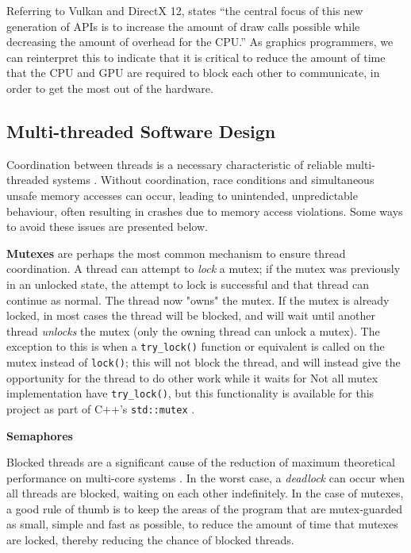 \documentclass[11pt, a4paper, twocolumn]{article}
\begin{document}
Referring to Vulkan and DirectX 12, \citet{Joseph2016} states ``the central focus of this new generation of APIs is to increase the amount of draw calls possible while decreasing the amount of overhead for the CPU.'' As graphics programmers, we can reinterpret this to indicate that it is critical to reduce the amount of time that the CPU and GPU are required to block each other to communicate, in order to get the most out of the hardware.

\subsection{Multi-threaded Software Design}

Coordination between threads is a necessary characteristic of reliable multi-threaded systems \citep{Powell}. Without coordination, race conditions and simultaneous unsafe memory accesses can occur, leading to unintended, unpredictable behaviour, often resulting in crashes due to memory access violations. Some ways to avoid these issues are presented below.

\textbf{Mutexes} are perhaps the most common mechanism to ensure thread coordination. A thread can attempt to \emph{lock} a mutex; if the mutex was previously in an unlocked state, the attempt to lock is successful and that thread can continue as normal. The thread now "owns" the mutex. If the mutex is already locked, in most cases the thread will be blocked, and will wait until another thread \emph{unlocks} the mutex (only the owning thread can unlock a mutex). The exception to this is when a \verb|try_lock()| function or equivalent is called on the mutex instead of \verb|lock()|; this will not block the thread, and will instead give the opportunity for the thread to do other work while it waits for  Not all mutex implementation have \verb|try_lock()|, but this functionality is available for this project as part of C++'s \verb|std::mutex| \citep{CppMutex}.


\textbf{Semaphores}

Blocked threads are a significant cause of the reduction of maximum theoretical performance on multi-core systems \citep{Alemany1992}. In the worst case, a \emph{deadlock} can occur when all threads are blocked, waiting on each other indefinitely. In the case of mutexes, a good rule of thumb is to keep the areas of the program that are mutex-guarded as small, simple and fast as possible, to reduce the amount of time that mutexes are locked, thereby reducing the chance of blocked threads.
\end{document}
